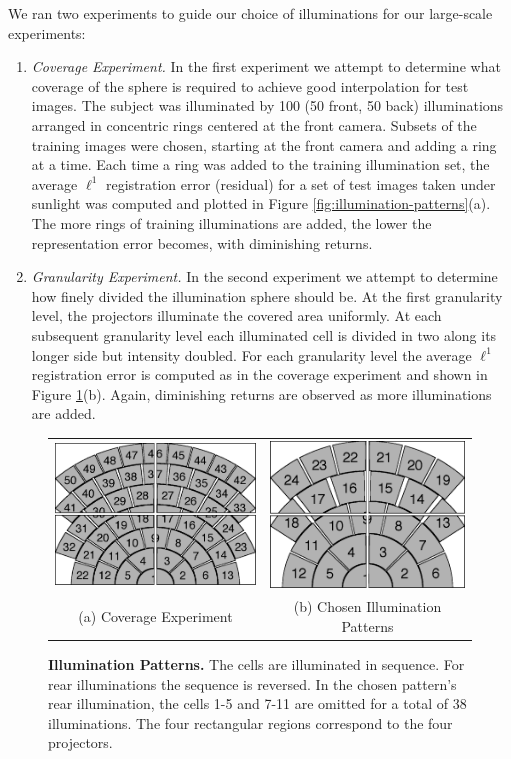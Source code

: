 \documentclass[10pt,journal,letterpaper,compsoc]{IEEEtran} %
\begin{document}
We ran two experiments to guide our choice of illuminations for
our large-scale experiments:
\begin{enumerate}
\item {\em Coverage Experiment.} In the first experiment we
    attempt to determine what coverage of the sphere is
    required to achieve good interpolation for test images.
    The subject was illuminated by 100 (50 front, 50 back)
    illuminations arranged in concentric rings centered at
    the front camera.  Subsets of the training images were
    chosen, starting at the front camera and adding a ring
    at a time.  Each time a ring was added to the training
    illumination set, the average $\ell^1$ registration
    error (residual) for a set of test images taken under
    sunlight was computed and plotted in Figure
    \ref{fig:illumination-patterns}(a).  The more rings of
    training illuminations are added, the lower the
    representation error becomes, with diminishing returns.
\item {\em Granularity Experiment.} In the second
    experiment we attempt to determine how finely divided
    the illumination sphere should be.  At the first
    granularity level, the projectors  illuminate the
    covered area uniformly.  At each subsequent granularity
    level each illuminated cell is divided in two along its
    longer side but intensity doubled.  For each
    granularity level the average $\ell^1$ registration
    error is computed as in the coverage experiment and
    shown in Figure \ref{fig:illumination-sufficiency}(b).
    Again, diminishing returns are observed as more
    illuminations are added.
\end{enumerate}
\begin{figure}
\centering
\begin{tabular}{cc}
\includegraphics[height=.75in]{figures_cvpr/coverage_experiment_asplode.png} &
\includegraphics[height=.75in]{figures_cvpr/final_cvpr_illuminations_asplode.png}  \\
(a) Coverage Experiment & (b) Chosen Illumination Patterns 
\end{tabular}\vspace{0mm}
\caption{{\bf Illumination Patterns.}   The cells are illuminated in sequence.  For rear illuminations the sequence is reversed.  In the chosen pattern's rear illumination, the cells 1-5 and 7-11 are omitted for a total of 38 illuminations. The four rectangular regions correspond to the four projectors.  }
\label{fig:illumination-patterns}\label{fig:illumination-sufficiency}
\vspace{-.75em}
\end{figure}
\end{document}
